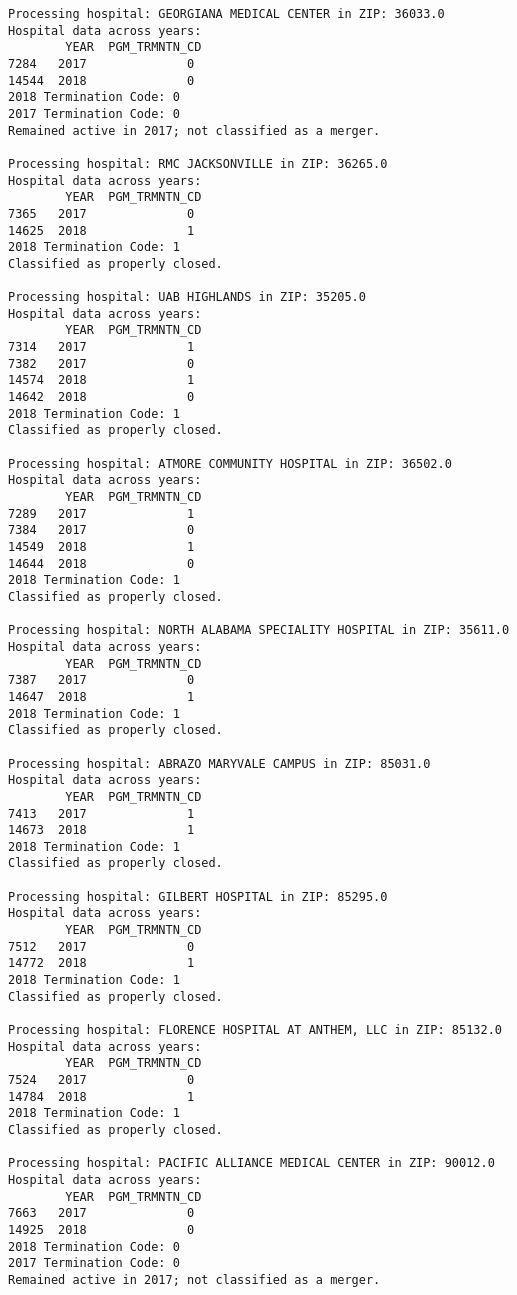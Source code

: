 \documentclass[
  letterpaper,
  DIV=11,
  numbers=noendperiod]{scrartcl}
\begin{document}
\begin{verbatim}
Processing hospital: GEORGIANA MEDICAL CENTER in ZIP: 36033.0
Hospital data across years:
        YEAR  PGM_TRMNTN_CD
7284   2017              0
14544  2018              0
2018 Termination Code: 0
2017 Termination Code: 0
Remained active in 2017; not classified as a merger.

Processing hospital: RMC JACKSONVILLE in ZIP: 36265.0
Hospital data across years:
        YEAR  PGM_TRMNTN_CD
7365   2017              0
14625  2018              1
2018 Termination Code: 1
Classified as properly closed.

Processing hospital: UAB HIGHLANDS in ZIP: 35205.0
Hospital data across years:
        YEAR  PGM_TRMNTN_CD
7314   2017              1
7382   2017              0
14574  2018              1
14642  2018              0
2018 Termination Code: 1
Classified as properly closed.

Processing hospital: ATMORE COMMUNITY HOSPITAL in ZIP: 36502.0
Hospital data across years:
        YEAR  PGM_TRMNTN_CD
7289   2017              1
7384   2017              0
14549  2018              1
14644  2018              0
2018 Termination Code: 1
Classified as properly closed.

Processing hospital: NORTH ALABAMA SPECIALITY HOSPITAL in ZIP: 35611.0
Hospital data across years:
        YEAR  PGM_TRMNTN_CD
7387   2017              0
14647  2018              1
2018 Termination Code: 1
Classified as properly closed.

Processing hospital: ABRAZO MARYVALE CAMPUS in ZIP: 85031.0
Hospital data across years:
        YEAR  PGM_TRMNTN_CD
7413   2017              1
14673  2018              1
2018 Termination Code: 1
Classified as properly closed.

Processing hospital: GILBERT HOSPITAL in ZIP: 85295.0
Hospital data across years:
        YEAR  PGM_TRMNTN_CD
7512   2017              0
14772  2018              1
2018 Termination Code: 1
Classified as properly closed.

Processing hospital: FLORENCE HOSPITAL AT ANTHEM, LLC in ZIP: 85132.0
Hospital data across years:
        YEAR  PGM_TRMNTN_CD
7524   2017              0
14784  2018              1
2018 Termination Code: 1
Classified as properly closed.

Processing hospital: PACIFIC ALLIANCE MEDICAL CENTER in ZIP: 90012.0
Hospital data across years:
        YEAR  PGM_TRMNTN_CD
7663   2017              0
14925  2018              0
2018 Termination Code: 0
2017 Termination Code: 0
Remained active in 2017; not classified as a merger.


\end{verbatim}
\end{document}
